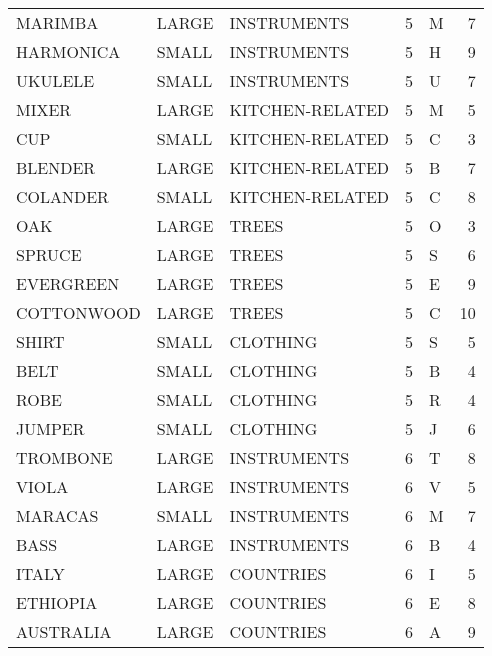 \begin{tabular}{lllrlr}
     MARIMBA & LARGE &      INSTRUMENTS &        5 &            M &       7 \\
   HARMONICA & SMALL &      INSTRUMENTS &        5 &            H &       9 \\
     UKULELE & SMALL &      INSTRUMENTS &        5 &            U &       7 \\
       MIXER & LARGE &  KITCHEN-RELATED &        5 &            M &       5 \\
         CUP & SMALL &  KITCHEN-RELATED &        5 &            C &       3 \\
     BLENDER & LARGE &  KITCHEN-RELATED &        5 &            B &       7 \\
    COLANDER & SMALL &  KITCHEN-RELATED &        5 &            C &       8 \\
         OAK & LARGE &            TREES &        5 &            O &       3 \\
      SPRUCE & LARGE &            TREES &        5 &            S &       6 \\
   EVERGREEN & LARGE &            TREES &        5 &            E &       9 \\
  COTTONWOOD & LARGE &            TREES &        5 &            C &      10 \\
       SHIRT & SMALL &         CLOTHING &        5 &            S &       5 \\
        BELT & SMALL &         CLOTHING &        5 &            B &       4 \\
        ROBE & SMALL &         CLOTHING &        5 &            R &       4 \\
      JUMPER & SMALL &         CLOTHING &        5 &            J &       6 \\
    TROMBONE & LARGE &      INSTRUMENTS &        6 &            T &       8 \\
       VIOLA & LARGE &      INSTRUMENTS &        6 &            V &       5 \\
     MARACAS & SMALL &      INSTRUMENTS &        6 &            M &       7 \\
        BASS & LARGE &      INSTRUMENTS &        6 &            B &       4 \\
       ITALY & LARGE &        COUNTRIES &        6 &            I &       5 \\
    ETHIOPIA & LARGE &        COUNTRIES &        6 &            E &       8 \\
   AUSTRALIA & LARGE &        COUNTRIES &        6 &            A &       9 \\

\end{tabular}
